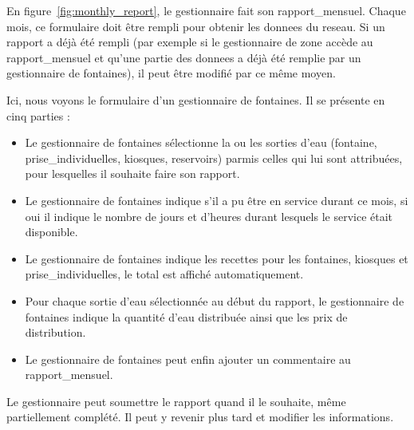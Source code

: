\documentclass[a4paper, 11pt]{article}
\begin{document}
    En figure~\ref{fig:monthly_report}, le gestionnaire fait son \gls{rapport_mensuel}. Chaque mois, ce formulaire doit être rempli pour obtenir les \glspl{donnee} du \gls{reseau}. Si un rapport a déjà été rempli (par exemple si le gestionnaire de \gls{zone} accède au \gls{rapport_mensuel} et qu'une partie des \glspl{donnee} a déjà été remplie par un gestionnaire de \glspl{fontaine}), il peut être modifié par ce même moyen.

    Ici, nous voyons le formulaire d'un gestionnaire de \glspl{fontaine}. Il se présente en cinq parties :
    \begin{itemize}
      \item Le gestionnaire de \glspl{fontaine} sélectionne la ou les sorties d'eau (\gls{fontaine}, \glspl{prise_individuelle}, kiosques, \glspl{reservoir}) parmis celles qui lui sont attribuées, pour lesquelles il souhaite faire son rapport.
      \item Le gestionnaire de \glspl{fontaine} indique s'il a pu être en service durant ce mois, si oui il indique le nombre de jours et d'heures durant lesquels le service était disponible.
      \item Le gestionnaire de \glspl{fontaine} indique les recettes pour les \glspl{fontaine}, kiosques et \glspl{prise_individuelle}, le total est affiché automatiquement.
      \item Pour chaque sortie d'eau sélectionnée au début du rapport, le gestionnaire de \glspl{fontaine} indique la quantité d'eau distribuée ainsi que les prix de distribution.
      \item Le gestionnaire de \glspl{fontaine} peut enfin ajouter un commentaire au \gls{rapport_mensuel}.
    \end{itemize}

    Le gestionnaire peut soumettre le rapport quand il le souhaite, même partiellement complété. Il peut y revenir plus tard et modifier les informations.
\end{document}
